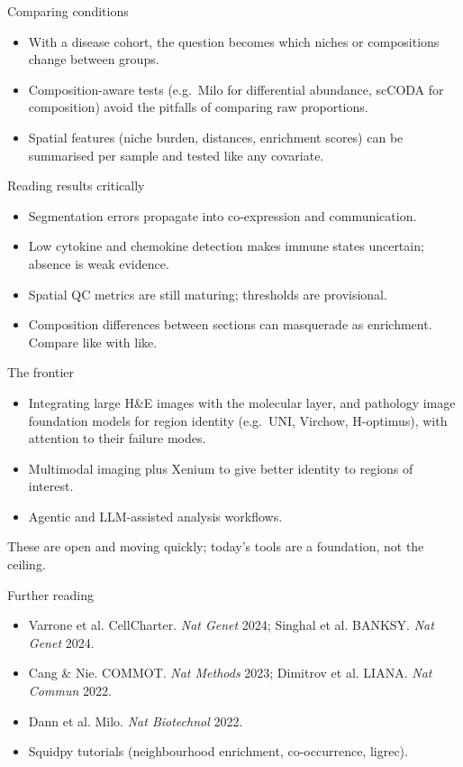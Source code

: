 \documentclass[aspectratio=169]{beamer}
\begin{document}
\begin{frame}{Comparing conditions}
  \begin{itemize}
    \item With a disease cohort, the question becomes which niches or compositions
      change between groups.
    \item Composition-aware tests (e.g.\ Milo for differential abundance, scCODA for
      composition) avoid the pitfalls of comparing raw proportions.
    \item Spatial features (niche burden, distances, enrichment scores) can be
      summarised per sample and tested like any covariate.
  \end{itemize}
\end{frame}

\begin{frame}{Reading results critically}
  \begin{itemize}
    \item Segmentation errors propagate into co-expression and communication.
    \item Low cytokine and chemokine detection makes immune states uncertain;
      absence is weak evidence.
    \item Spatial QC metrics are still maturing; thresholds are provisional.
    \item Composition differences between sections can masquerade as enrichment.
      Compare like with like.
  \end{itemize}
\end{frame}

\begin{frame}{The frontier}
  \begin{itemize}
    \item Integrating large H\&E images with the molecular layer, and pathology
      image foundation models for region identity (e.g.\ UNI, Virchow,
      H-optimus), with attention to their failure modes.
    \item Multimodal imaging plus Xenium to give better identity to regions of
      interest.
    \item Agentic and LLM-assisted analysis workflows.
  \end{itemize}
  These are open and moving quickly; today's tools are a foundation, not the ceiling.
\end{frame}

\begin{frame}{Further reading}
  \footnotesize
  \begin{itemize}
    \item Varrone et al. CellCharter. \emph{Nat Genet} 2024; Singhal et al. BANKSY. \emph{Nat Genet} 2024.
    \item Cang \& Nie. COMMOT. \emph{Nat Methods} 2023; Dimitrov et al. LIANA. \emph{Nat Commun} 2022.
    \item Dann et al. Milo. \emph{Nat Biotechnol} 2022.
    \item Squidpy tutorials (neighbourhood enrichment, co-occurrence, ligrec).
  \end{itemize}
\end{frame}
\end{document}
